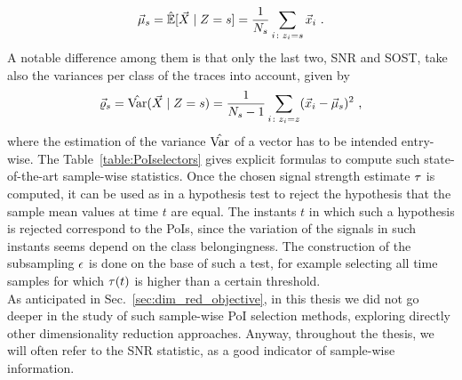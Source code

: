 \begin{equation}\label{eq:mmmXclass}
\mmmXclass= \esperEst[\given{\vaLeakVec}{\sensRandVar = \sensVarGenValue}] = \frac{1}{\nbTracesPerClass}\sum_{i\colon \sensVar_i=\sensVarGenValue} \vLeakVec_i  \mbox{ .}
\end{equation} 
A notable difference among them is that only the last two, SNR and SOST, take also the variances per class of the traces into account, given by
\begin{equation}
\varXclass = \varEst(\given{\vaLeakVec}{\sensRandVar = \sensVarGenValue}) = \frac{1}{\nbTracesPerClass-1}\sum_{i\colon \sensVar_i=\sensVar} (\vLeakVec_i - \mmmXclass)^2 \mbox{ ,}
\end{equation}
where the estimation of the variance $\hat{\mathrm{Var}}$ of a vector has to be intended entry-wise.
The Table~\ref{table:PoIselectors} gives explicit formulas to compute such state-of-the-art sample-wise statistics. Once the chosen signal strength estimate $\tau$ is computed, it can be used as in a hypothesis test to reject the hypothesis that the sample mean values at time $t$ are equal. The instants $t$ in which such a hypothesis is rejected correspond to the PoIs, since the variation of the signals in such instants seems depend on the class belongingness. The construction of the subsampling $\epsilon$ is done on the base of such a test, for example selecting all time samples for which $\tau(t)$ is higher than a certain threshold. \\

As anticipated in Sec.~\ref{sec:dim_red_objective}, in this thesis we did not go deeper in the study of such sample-wise PoI selection methods, exploring directly other dimensionality reduction approaches. Anyway, throughout the thesis, we will often refer to the SNR statistic, as a good indicator of sample-wise information.


